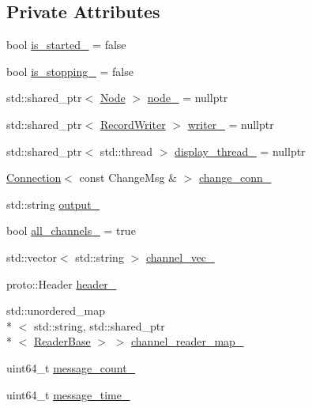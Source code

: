 \subsection*{Private Attributes}
\begin{DoxyCompactItemize}
\item 
bool \hyperlink{classapollo_1_1cyber_1_1record_1_1Recorder_a45e46219c614d60f478fe179c055f929}{is\-\_\-started\-\_\-} = false
\item 
bool \hyperlink{classapollo_1_1cyber_1_1record_1_1Recorder_a35686e54ba6d3d1e016db22eb658932a}{is\-\_\-stopping\-\_\-} = false
\item 
std\-::shared\-\_\-ptr$<$ \hyperlink{classapollo_1_1cyber_1_1Node}{Node} $>$ \hyperlink{classapollo_1_1cyber_1_1record_1_1Recorder_a5f3b7c6dd94a93238437099ffabd640f}{node\-\_\-} = nullptr
\item 
std\-::shared\-\_\-ptr$<$ \hyperlink{classapollo_1_1cyber_1_1record_1_1RecordWriter}{Record\-Writer} $>$ \hyperlink{classapollo_1_1cyber_1_1record_1_1Recorder_a84a6307202707dd3af88342aa5b587a0}{writer\-\_\-} = nullptr
\item 
std\-::shared\-\_\-ptr$<$ std\-::thread $>$ \hyperlink{classapollo_1_1cyber_1_1record_1_1Recorder_a3501b5e072094c92b9e395da2efce38d}{display\-\_\-thread\-\_\-} = nullptr
\item 
\hyperlink{classapollo_1_1cyber_1_1base_1_1Connection}{Connection}$<$ const Change\-Msg \& $>$ \hyperlink{classapollo_1_1cyber_1_1record_1_1Recorder_a19008dc3b5064e0e160873b8dce8c471}{change\-\_\-conn\-\_\-}
\item 
std\-::string \hyperlink{classapollo_1_1cyber_1_1record_1_1Recorder_a882605447aa4a2057c9b23257b73e353}{output\-\_\-}
\item 
bool \hyperlink{classapollo_1_1cyber_1_1record_1_1Recorder_a6ee49bb5607d8fddd9d7cc1e6d6cfeec}{all\-\_\-channels\-\_\-} = true
\item 
std\-::vector$<$ std\-::string $>$ \hyperlink{classapollo_1_1cyber_1_1record_1_1Recorder_af5005f0a82b3f286eab34ed3cec721cf}{channel\-\_\-vec\-\_\-}
\item 
proto\-::\-Header \hyperlink{classapollo_1_1cyber_1_1record_1_1Recorder_a535751fe26620a816ea114cf44065fe6}{header\-\_\-}
\item 
std\-::unordered\-\_\-map\\*
$<$ std\-::string, std\-::shared\-\_\-ptr\\*
$<$ \hyperlink{classapollo_1_1cyber_1_1ReaderBase}{Reader\-Base} $>$ $>$ \hyperlink{classapollo_1_1cyber_1_1record_1_1Recorder_a216e4e98ce9314a8e527fad21f79ff9e}{channel\-\_\-reader\-\_\-map\-\_\-}
\item 
uint64\-\_\-t \hyperlink{classapollo_1_1cyber_1_1record_1_1Recorder_ad59a9ed9e4cda30bd266dea4943e5a18}{message\-\_\-count\-\_\-}
\item 
uint64\-\_\-t \hyperlink{classapollo_1_1cyber_1_1record_1_1Recorder_ab96a45009399e22bd8f0be7a4119f884}{message\-\_\-time\-\_\-}
\end{DoxyCompactItemize}


